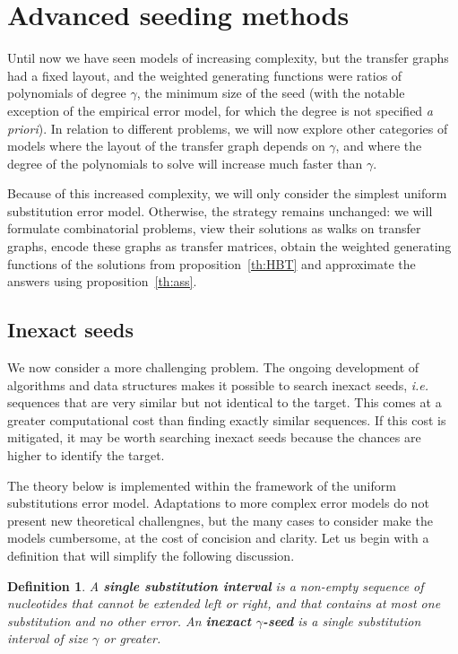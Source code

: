 \documentclass{article}
\newtheorem{definition}{Definition}
\begin{document}
\section{Advanced seeding methods}
\label{sec:advanced}

Until now we have seen models of increasing complexity, but the transfer
graphs had a fixed layout, and the weighted generating functions were
ratios of polynomials of degree $\gamma$, the minimum size of the seed
(with the notable exception of the empirical error model, for which the
degree is not specified \textit{a priori}). In relation to different
problems, we will now explore other categories of models where the layout
of the transfer graph depends on $\gamma$, and where the degree of the
polynomials to solve will increase much faster than $\gamma$.

Because of this increased complexity, we will only consider the simplest
uniform substitution error model. Otherwise, the strategy remains
unchanged: we will formulate combinatorial problems, view their solutions
as walks on transfer graphs, encode these graphs as transfer matrices,
obtain the weighted generating functions of the solutions from
proposition~\ref{th:HBT} and approximate the answers using
proposition~\ref{th:ass}.

\subsection{Inexact seeds}

We now consider a more challenging problem. The ongoing development of
algorithms and data structures makes it possible to search inexact seeds,
\textit{i.e.} sequences that are very similar but not identical to the
target. This comes at a greater computational cost than finding exactly
similar sequences. If this cost is mitigated, it may be worth searching
inexact seeds because the chances are higher to identify the target.

The theory below is implemented within the framework of the uniform
substitutions error model. Adaptations to more complex error models do not
present new theoretical challengnes, but the many cases to consider make
the models cumbersome, at the cost of concision and clarity. Let us begin
with a definition that will simplify the following discussion.

\begin{definition}
A \textbf{single substitution interval} is a non-empty sequence of
nucleotides that cannot be extended left or right, and that contains at
most one substitution and no other error. An \textbf{inexact
$\gamma$-seed} is a single substitution interval of size $\gamma$ or
greater.
\end{definition}
\end{document}
